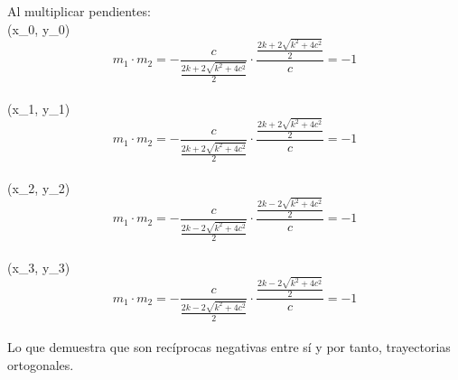 \documentclass[12pt]{article}
\begin{document}
Al multiplicar pendientes:\\
(x_0, y_0)\\
\[
  m_1 \cdot m_2 = -\frac{c}{ \frac{2k+2\sqrt{k^2+4c^2}}{2} }    \cdot  \frac {  \frac {2k+2\sqrt{k^2+4c^2}}  {2}  }{ c} = -1
 \] \\
(x_1, y_1)
\[
  m_1 \cdot m_2 = - \frac {c}{ \frac {2k+2\sqrt{k^2+4c^2}} {2}} \cdot \frac {  \frac {2k+2\sqrt{k^2+4c^2}}  {2}  } {c} =- 1
\]\\
(x_2, y_2)
\[
  m_1 \cdot m_2 = -\frac {c}{ \frac {2k-2\sqrt{k^2+4c^2}} {2}} \cdot \frac {  \frac {2k-2\sqrt{k^2+4c^2}}  {2}  } {c} = -1
  \]\\
(x_3, y_3)
\[
  m_1 \cdot m_2 =  - \frac {c}{ \frac {2k-2\sqrt{k^2+4c^2}} {2}} \cdot   \frac {  \frac {2k-2\sqrt{k^2+4c^2}}  {2}  } {c} = -1
  \]\\
Lo que demuestra que son recíprocas negativas entre sí y por tanto, trayectorias ortogonales.
\end{document}
